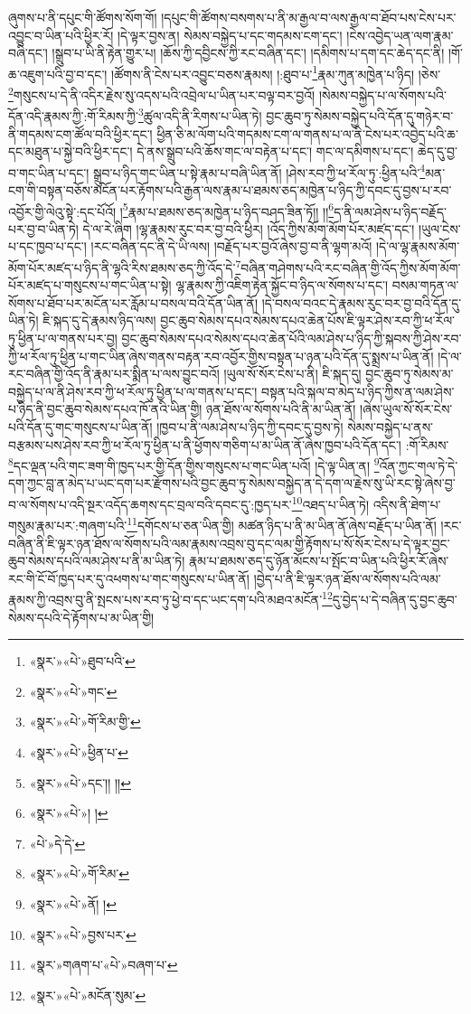 ཞུགས་པ་ནི་དཔུང་གི་ཚོགས་སོག་གོ། །དཔུང་གི་ཚོགས་བསགས་པ་ནི་མ་རྒྱལ་བ་ལས་རྒྱལ་བ་ཐོབ་པས་ངེས་པར་འབྱུང་བ་ཡིན་པའི་ཕྱིར་རོ། །དེ་ལྟར་བྱས་ན། སེམས་བསྐྱེད་པ་དང་གདམས་ངག་དང་། །ངེས་འབྱེད་ཡན་ལག་རྣམ་བཞི་དང་། །སྒྲུབ་པ་ཡི་ནི་རྟེན་གྱུར་པ། །ཆོས་ཀྱི་དབྱིངས་ཀྱི་རང་བཞིན་དང་། །དམིགས་པ་དག་དང་ཆེད་དང་ནི། །གོ་ཆ་འཇུག་པའི་བྱ་བ་དང་། །ཚོགས་ནི་ངེས་པར་འབྱུང་བཅས་རྣམས། །:ཐུབ་པ་\footnote{«སྣར་»«པེ་»ཐུབ་པའི་}རྣམ་ཀུན་མཁྱེན་པ་ཉིད། །ཅེས་\footnote{«སྣར་»«པེ་»གང་}གསུངས་པ་དེ་ནི་འདིར་རྗེས་སུ་འདས་པའི་འབྲེལ་པ་ཡིན་པར་བལྟ་བར་བྱའོ། །སེམས་བསྐྱེད་པ་ལ་སོགས་པའི་དོན་འདི་རྣམས་ཀྱི་:གོ་རིམས་ཀྱི་\footnote{«སྣར་»«པེ་»གོ་རིམ་གྱི་}ཚུལ་འདི་ནི་རིགས་པ་ཡིན་ཏེ། བྱང་ཆུབ་ཏུ་སེམས་བསྐྱེད་པའི་དོན་དུ་གཉེར་བ་ནི་གདམས་ངག་ཚོལ་བའི་ཕྱིར་དང་། ཕྱིན་ཅི་མ་ལོག་པའི་གདམས་ངག་ལ་གནས་པ་ལ་ནི་ངེས་པར་འབྱེད་པའི་ཆ་དང་མཐུན་པ་སྐྱེ་བའི་ཕྱིར་དང་། དེ་ནས་སྒྲུབ་པའི་ཆོས་གང་ལ་བརྟེན་པ་དང་། གང་ལ་དམིགས་པ་དང་། ཆེད་དུ་བྱ་བ་གང་ཡིན་པ་དང་། སྒྲུབ་པ་ཉིད་གང་ཡིན་པ་སྟེ་རྣམ་པ་བཞི་ཡིན་ནོ། །ཤེས་རབ་ཀྱི་ཕ་རོལ་ཏུ་:ཕྱིན་པའི་\footnote{«སྣར་»«པེ་»ཕྱིན་པ་}མན་ངག་གི་བསྟན་བཅོས་མངོན་པར་རྟོགས་པའི་རྒྱན་ལས་རྣམ་པ་ཐམས་ཅད་མཁྱེན་པ་ཉིད་ཀྱི་དབང་དུ་བྱས་པ་རབ་འབྱོར་གྱི་ལེའུ་སྟེ་:དང་པོའོ། །\footnote{«སྣར་»«པེ་»དང་།། །།}རྣམ་པ་ཐམས་ཅད་མཁྱེན་པ་ཉིད་བཤད་ཟིན་ཏོ།། །།\footnote{«སྣར་»«པེ་»། །}ད་ནི་ལམ་ཤེས་པ་ཉིད་བརྗོད་པར་བྱ་བ་ཡིན་ཏེ། དེ་ལ་རེ་ཞིག །ལྷ་རྣམས་རུང་བར་བྱ་བའི་ཕྱིར། །འོད་ཀྱིས་མོག་མོག་པོར་མཛད་དང་། །ཡུལ་ངེས་པ་དང་ཁྱབ་པ་དང་། །རང་བཞིན་དང་ནི་དེ་ཡི་ལས། །བརྗོད་པར་བྱའོ་ཞེས་བྱ་བ་ནི་ལྷག་མའོ། །དེ་ལ་ལྷ་རྣམས་མོག་མོག་པོར་མཛད་པ་ཉིད་ནི་ལྷའི་རིས་ཐམས་ཅད་ཀྱི་འོད་དེ་\footnote{«པེ་»དེ་དེ་}བཞིན་གཤེགས་པའི་རང་བཞིན་གྱི་འོད་ཀྱིས་མོག་མོག་པོར་མཛད་པ་གསུངས་པ་གང་ཡིན་པ་སྟེ། ལྷ་རྣམས་ཀྱི་འཇིག་རྟེན་སྐྱོང་བ་ཉིད་ལ་སོགས་པ་དང་། བསམ་གཏན་ལ་སོགས་པ་ཐོབ་པར་མངོན་པར་རློམ་པ་བསལ་བའི་དོན་ཡིན་ནོ། །དེ་བསལ་བའང་དེ་རྣམས་རུང་བར་བྱ་བའི་དོན་དུ་ཡིན་ཏེ། ཇི་སྐད་དུ་དེ་རྣམས་ཉིད་ལས། བྱང་ཆུབ་སེམས་དཔའ་སེམས་དཔའ་ཆེན་པོས་ཇི་ལྟར་ཤེས་རབ་ཀྱི་ཕ་རོལ་ཏུ་ཕྱིན་པ་ལ་གནས་པར་བྱ། བྱང་ཆུབ་སེམས་དཔའ་སེམས་དཔའ་ཆེན་པོའི་ལམ་ཤེས་པ་ཉིད་ཀྱི་སྐབས་ཀྱི་ཤེས་རབ་ཀྱི་ཕ་རོལ་ཏུ་ཕྱིན་པ་གང་ཡིན་ཞེས་གནས་བརྟན་རབ་འབྱོར་གྱིས་བསྟན་པ་ཉན་པའི་དོན་དུ་སྨྲས་པ་ཡིན་ནོ། །དེ་ལ་རང་བཞིན་གྱི་འོད་ནི་རྣམ་པར་སྨིན་པ་ལས་བྱུང་བའོ། །ཡུལ་སོ་སོར་ངེས་པ་ནི། ཇི་སྐད་དུ། བྱང་ཆུབ་ཏུ་སེམས་མ་བསྐྱེད་པ་ལ་ནི་ཤེས་རབ་ཀྱི་ཕ་རོལ་ཏུ་ཕྱིན་པ་ལ་གནས་པ་དང་། བསྟན་པའི་སྐལ་བ་མེད་པ་ཉིད་ཀྱིས་ན་ལམ་ཤེས་པ་ཉིད་ནི་བྱང་ཆུབ་སེམས་དཔའ་ཁོ་ནའི་ཡིན་གྱི། ཉན་ཐོས་ལ་སོགས་པའི་ནི་མ་ཡིན་ནོ། །ཞེས་ཡུལ་སོ་སོར་ངེས་པའི་དོན་དུ་གང་གསུངས་པ་ཡིན་ནོ། །ཁྱབ་པ་ནི་ལམ་ཤེས་པ་ཉིད་ཀྱི་དབང་དུ་བྱས་ཏེ། སེམས་བསྐྱེད་པ་ནས་བརྩམས་པས་ཤེས་རབ་ཀྱི་ཕ་རོལ་ཏུ་ཕྱིན་པ་ནི་ཕྱོགས་གཅིག་པ་མ་ཡིན་ནོ་ཞེས་ཁྱབ་པའི་དོན་དང་། :གོ་རིམས་\footnote{«སྣར་»«པེ་»གོ་རིམ་}དང་ལྡན་པའི་གང་ཟག་གི་ཁྱད་པར་གྱི་དོན་གྱིས་གསུངས་པ་གང་ཡིན་པའོ། །དེ་ལྟ་ཡིན་ན། \footnote{«སྣར་»«པེ་»ནོ། ། }འོན་ཀྱང་གལ་ཏེ་དེ་དག་ཀྱང་བླ་ན་མེད་པ་ཡང་དག་པར་རྫོགས་པའི་བྱང་ཆུབ་ཏུ་སེམས་བསྐྱེད་ན་དེ་དག་ལ་རྗེས་སུ་ཡི་རང་སྟེ་ཞེས་བྱ་བ་ལ་སོགས་པ་འདི་སྔར་འདོད་ཆགས་དང་བྲལ་བའི་དབང་དུ་:ཁྱད་པར་\footnote{«སྣར་»«པེ་»བྱས་པར་}འཐད་པ་ཡིན་ཏེ། འདིས་ནི་ཐེག་པ་གསུམ་རྣམ་པར་:གཞག་པའི་\footnote{«སྣར་»གཞག་པ་«པེ་»བཞག་པ་}དགོངས་པ་ཅན་ཡིན་གྱི། མཚན་ཉིད་པ་ནི་མ་ཡིན་ནོ་ཞེས་བརྗོད་པ་ཡིན་ནོ། །རང་བཞིན་ནི་ཇི་ལྟར་ཉན་ཐོས་ལ་སོགས་པའི་ལམ་རྣམས་འབྲས་བུ་དང་ལམ་གྱི་རྟོགས་པ་སོ་སོར་ངེས་པ་དེ་ལྟར་བྱང་ཆུབ་སེམས་དཔའི་ལམ་ཤེས་པ་ནི་མ་ཡིན་ཏེ། རྣམ་པ་ཐམས་ཅད་དུ་ཉོན་མོངས་པ་སྤོང་བ་ཡིན་པའི་ཕྱིར་རོ་ཞེས་རང་གི་ངོ་བོ་ཁྱད་པར་དུ་འཕགས་པ་གང་གསུངས་པ་ཡིན་ནོ། །བྱེད་པ་ནི་ཇི་ལྟར་ཉན་ཐོས་ལ་སོགས་པའི་ལམ་རྣམས་ཀྱི་འབྲས་བུ་ནི་སྤངས་པས་རབ་ཏུ་ཕྱེ་བ་དང་ཡང་དག་པའི་མཐའ་མངོན་\footnote{«སྣར་»«པེ་»མངོན་སུམ་}དུ་བྱེད་པ་དེ་བཞིན་དུ་བྱང་ཆུབ་སེམས་དཔའི་དེ་རྟོགས་པ་མ་ཡིན་གྱི། 